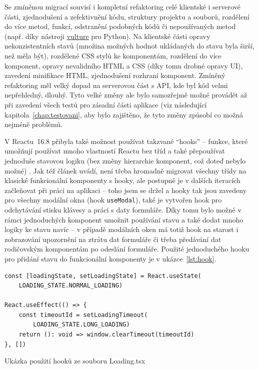 Se zmíněnou migrací souvisí i kompletní refaktoring celé klientské i serverové části, zjednodušení a zefektivnění kódu, struktury projektu a souborů, rozdělení do více metod, funkcí, odstranění podobných kódů či nepoužívaných metod (např. díky nástroji \href{https://github.com/jendrikseipp/vulture/}{vulture} pro Python). Na klientské části opravy nekonzistentních stavů (množina možných hodnot ukládaných do stavu byla širší, než měla být),  rozdělené CSS stylů ke komponentám, rozdělení do více komponent, opravy nevalidního HTML a CSS (díky tomu drobné opravy UI), zavedení minifikace HTML, zjednodušení rozhraní komponent. Zmíněný refaktoring měl velký dopad na serverovou část s API, kde byl kód velmi nepřehledný, dlouhý. Tyto velké změny ale bylo samozřejmě možné provádět až při zavedení všech testů pro zásadní části aplikace (viz následující kapitola~\ref{chap:testovani}, aby bylo zajištěno, že tyto změny způsobí co možná nejméně problémů.

V Reactu~16.8 přibyla také možnost používat takzvané \enquote{hooks} -- funkce, které umožňují používat mnoho vlastností Reactu bez tříd a také přepoužívat jednoduše stavovou logiku (bez změny hierarchie komponent, což doteď nebylo možné) \cite{react-docs-hooks}. Jak též článek \cite{react-docs-hooks} uvádí, není třeba hromadně migrovat všechny třídy na klasické funkcionální komponenty s hooky, ale postupně je v dalších iteracích začleňovat při práci na aplikaci -- toho jsem se držel a hooky tak jsou zavedeny pro všechny modální okna (hook \verb|useModal|), také je vytvořen hook pro odchytávání stisku klávesy a práci s daty formuláře. Díky tomu bylo možné v rámci jednoduchých komponent umožnit používání stavu a také dodat mnoho logiky ke stavu navíc -- v případě modálních oken má totiž hook na starost i zobrazování upozornění na ztrátu dat formuláře či třeba předávání dat rodičovským komponentám po odeslání formuláře. Použité jednoduchého hooku pro přidání stavu do funkcionální komponenty je v ukázce~\ref{lst:hook}.

\begin{listing}[ht]
	\begin{verbatim}
const [loadingState, setLoadingState] = React.useState(
    LOADING_STATE.NORMAL_LOADING)

React.useEffect(() => {
    const timeoutId = setLoadingTimeout(
        LOADING_STATE.LONG_LOADING)
    return (): void => window.clearTimeout(timeoutId)
}, [])
	\end{verbatim}
	\caption{Ukázka použití hooků ze souboru Loading.tsx}\label{lst:hook}
\end{listing}

